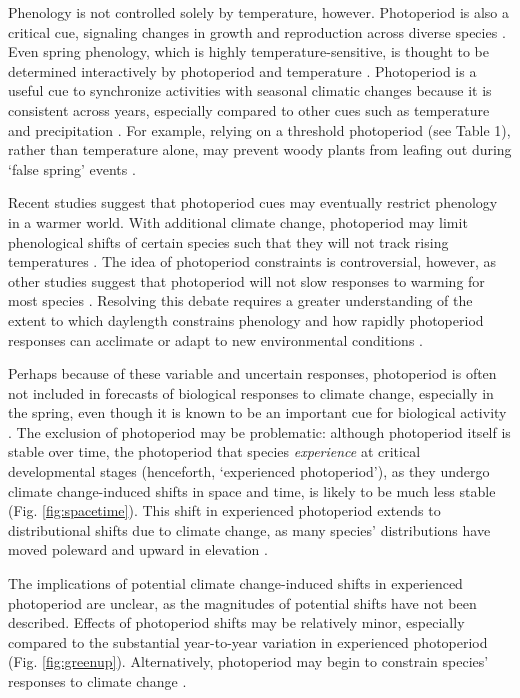 \documentclass{article}
\begin{document}
\par Phenology is not controlled solely by temperature, however. Photoperiod is also a critical cue, signaling changes in growth and reproduction across diverse species \citep[e.g.,][]{flynn2018,lagercrantz2009,bradshaw2007,Howe:1996,solbakken1994}. Even spring phenology, which is highly temperature-sensitive, is thought to be determined interactively by photoperiod and temperature \citep[][see also Box 1]{fu2019}. Photoperiod is a useful cue to synchronize activities with seasonal climatic changes \citep[e.g.,][]{Singh:2017, Basler:2012, Hsu:2011} because it is consistent across years, especially compared to other cues such as temperature and precipitation \citep{saikkonen2012}.  For example, relying on a threshold photoperiod (see Table 1), rather than temperature alone, may prevent woody plants from leafing out during `false spring' events \citep[unusually warm periods during winter and early spring that are followed by a return to cold temperatures,][]{gu2008}. 

\par Recent studies suggest that photoperiod cues may eventually restrict phenology in a warmer world. With additional climate change, photoperiod may limit phenological shifts of certain species such that they will not track rising temperatures \citep{fu2015,way2015,Basler:2012,koerner2010a}. The idea of photoperiod constraints is controversial, however, as other studies suggest that photoperiod will not slow responses to warming for most species \citep{chuine2010,zohner2016}. Resolving this debate requires a greater understanding of the extent to which daylength constrains phenology and how rapidly photoperiod responses can acclimate or adapt to new environmental conditions \citep{grevstad2015}.

\par Perhaps because of these variable and uncertain responses, photoperiod is often not included in forecasts of biological responses to climate change, especially in the spring, even though it is known to be an important cue for biological activity \citep[but see ][]{duputie2015,grevstad2015,Caffarra:2011qf}. The exclusion of photoperiod may be problematic: although photoperiod itself is stable over time, the photoperiod that species \emph{experience} at critical developmental stages (henceforth, `experienced photoperiod'), as they undergo climate change-induced shifts in space and time, is likely to be much less stable (Fig. \ref{fig:spacetime}). This shift in experienced photoperiod extends to distributional shifts due to climate change, as many species' distributions have moved poleward and upward in elevation \citep[i.e., range shifts,][]{chen2011,harsch2009,parmesan2006,penuelas2003}. 
\par The implications of potential climate change-induced shifts in experienced photoperiod are unclear, as the magnitudes of potential shifts have not been described. Effects of photoperiod shifts may be relatively minor, especially compared to the substantial year-to-year variation in experienced photoperiod (Fig. \ref{fig:greenup}). Alternatively, photoperiod may begin to constrain species' responses to climate change \citep{huffeldt2020,fu2015,way2015,Basler:2012,koerner2010a}.
\end{document}
